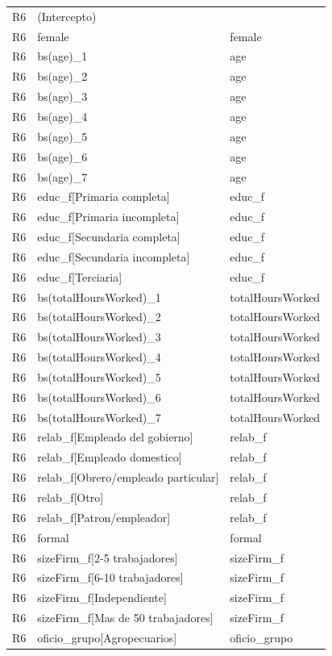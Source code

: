 \begin{longtable}{lll}
R6 & (Intercepto) &  \\
R6 & female & female \\
R6 & bs(age)\_1 & age \\
R6 & bs(age)\_2 & age \\
R6 & bs(age)\_3 & age \\
R6 & bs(age)\_4 & age \\
R6 & bs(age)\_5 & age \\
R6 & bs(age)\_6 & age \\
R6 & bs(age)\_7 & age \\
R6 & educ\_f[Primaria completa] & educ\_f \\
R6 & educ\_f[Primaria incompleta] & educ\_f \\
R6 & educ\_f[Secundaria completa] & educ\_f \\
R6 & educ\_f[Secundaria incompleta] & educ\_f \\
R6 & educ\_f[Terciaria] & educ\_f \\
R6 & bs(totalHoursWorked)\_1 & totalHoursWorked \\
R6 & bs(totalHoursWorked)\_2 & totalHoursWorked \\
R6 & bs(totalHoursWorked)\_3 & totalHoursWorked \\
R6 & bs(totalHoursWorked)\_4 & totalHoursWorked \\
R6 & bs(totalHoursWorked)\_5 & totalHoursWorked \\
R6 & bs(totalHoursWorked)\_6 & totalHoursWorked \\
R6 & bs(totalHoursWorked)\_7 & totalHoursWorked \\
R6 & relab\_f[Empleado del gobierno] & relab\_f \\
R6 & relab\_f[Empleado domestico] & relab\_f \\
R6 & relab\_f[Obrero/empleado particular] & relab\_f \\
R6 & relab\_f[Otro] & relab\_f \\
R6 & relab\_f[Patron/empleador] & relab\_f \\
R6 & formal & formal \\
R6 & sizeFirm\_f[2-5 trabajadores] & sizeFirm\_f \\
R6 & sizeFirm\_f[6-10 trabajadores] & sizeFirm\_f \\
R6 & sizeFirm\_f[Independiente] & sizeFirm\_f \\
R6 & sizeFirm\_f[Mas de 50 trabajadores] & sizeFirm\_f \\
R6 & oficio\_grupo[Agropecuarios] & oficio\_grupo \\

\end{longtable}
